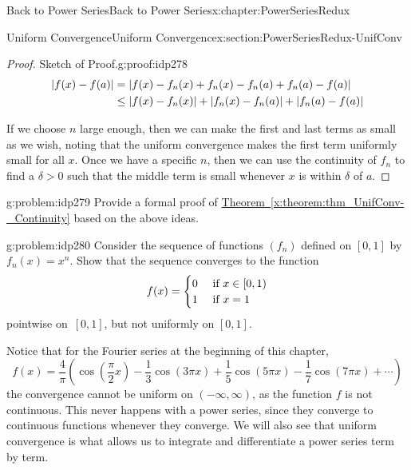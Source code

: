 \begin{chapterptx}{Back to Power Series}{}{Back to Power Series}{}{}{x:chapter:PowerSeriesRedux}
\begin{sectionptx}{Uniform Convergence}{}{Uniform Convergence}{}{}{x:section:PowerSeriesRedux-UnifConv}
\begin{proof}{Sketch of Proof.}{g:proof:idp278}
\begin{align*}
				\left|f(x)-f(a)\right|& =\left|f(x)-f_n(x)+f_n(x)-f_n(a)+f_n(a)-f(a)\right|\\
				& \leq \left|f(x)-f_n(x)\right|+\left|f_n(x)-f_n(a)\right|+\left|f_n(a)-f(a)\right|
			\end{align*}
			\par
			If we choose \(n\) large enough, then we can make the first and last terms as small as we wish, noting that the uniform convergence makes the first term uniformly small for all \(x\). Once we have a specific \(n\), then we can use the continuity of \(f_n\) to find a \(\delta>0\) such that the middle term is small whenever \(x\) is within \(\delta\) of \(a\).%
		\end{proof}
		\begin{problem}{}{g:problem:idp279}%
			 Provide a formal proof of \hyperref[x:theorem:thm_UnifConv-_Continuity]{Theorem~{\xreffont\ref{x:theorem:thm_UnifConv-_Continuity}}} based on the above ideas.%
		\end{problem}
		\begin{problem}{}{g:problem:idp280}%
			 Consider the sequence of functions \(\left(f_n\right)\) defined on \([0,1]\) by \(f_n(x)=x^n\). Show that the sequence converges to the function%
			\begin{equation*}
				f(x)= \begin{cases}0& \text{ if  } x\in[0,1)\\ 1& \text{ if } x=1 \end{cases}
			\end{equation*}
			pointwise on \(\,[0,1]\), but not uniformly on \([0,1]\).%
		\end{problem}
		Notice that for the Fourier series at the beginning of this chapter,%
		\begin{equation*}
			f(x)=\frac{4}{\pi}\left(\cos\left(\frac{\pi}{2}x\right)-\frac{1}{3}\cos\left( 3\pi x\right)+\frac{1}{5}\cos\left(5\pi x\right)-\frac{1}{7}\cos\left(7\pi x\right)+\cdots\right)
		\end{equation*}
		the convergence cannot be uniform on \((-\infty,\infty)\), as the function \(f\) is not continuous. This never happens with a power series, since they converge to continuous functions whenever they converge. We will also see that uniform convergence is what allows us to integrate and differentiate a power series term by term.%
	\end{sectionptx}

\end{chapterptx}
